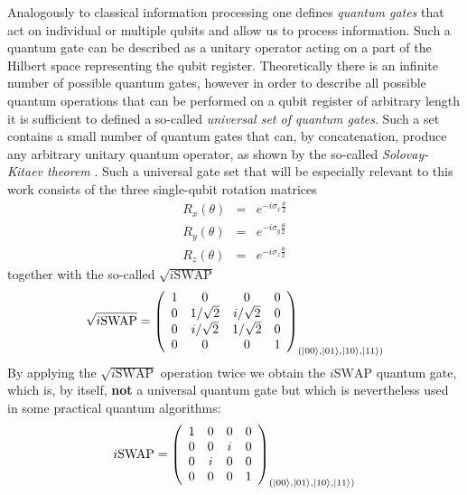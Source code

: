 Analogously to classical information processing one defines {\it quantum gates} that act on individual or multiple qubits and allow us to process information. Such a quantum gate can be described as a unitary operator acting on a part of the Hilbert space representing the qubit register. Theoretically there is an infinite number of possible quantum gates, however in order to describe all possible quantum operations that can be performed on a qubit register of arbitrary length it is sufficient to defined a so-called {\it universal set of quantum gates}. Such a set contains a small number of quantum gates that can, by concatenation, produce any arbitrary unitary quantum operator, as shown by the so-called {\it Solovay-Kitaev theorem} \citep{nielsen_quantum_2000,dawson_solovay-kitaev_2005}. Such a universal gate set that will be especially relevant to this work consists of the three single-qubit rotation matrices
%
\begin{eqnarray}
   R_x(\theta)  & = & e^{-i\sigma_x\frac{\theta}{2}} \\ 
   R_y(\theta)  & = & e^{-i\sigma_y\frac{\theta}{2}} \\ 
   R_z(\theta)  & = & e^{-i\sigma_z\frac{\theta}{2}} 
\label{eq:universal_single_qubit_gates}
\end{eqnarray}
%
together with the so-called $\sqrt{i\mathrm{SWAP}}$
%
\begin{equation}
\sqrt{i\mathrm{SWAP}} = \left( \begin{array}{cccc} 1 & 0 & 0 & 0 \\ 0 & 1/\sqrt{2} & i/\sqrt{2} & 0 \\ 0 & i/\sqrt{2} & 1/\sqrt{2} & 0 \\ 0 & 0 & 0 & 1  \end{array}  \right)_{(\left| 00 \right>,\left| 01 \right>,\left| 10 \right>,\left| 11 \right>)}
\end{equation}
%
By applying the $\sqrt{i\mathrm{SWAP}}$ operation twice we obtain the $i\mathrm{SWAP}$ quantum gate, which is, by itself, \textbf{not} a universal quantum gate but which is nevertheless used in some practical quantum algorithms:
%
\begin{equation}
i\mathrm{SWAP} = \left( \begin{array}{cccc} 1 & 0 & 0 & 0 \\ 0 & 0 & i & 0 \\ 0 & i & 0 & 0 \\ 0 & 0 & 0 & 1  \end{array}  \right)_{(\left| 00 \right>,\left| 01 \right>,\left| 10 \right>,\left| 11 \right>)}
\end{equation}
%

